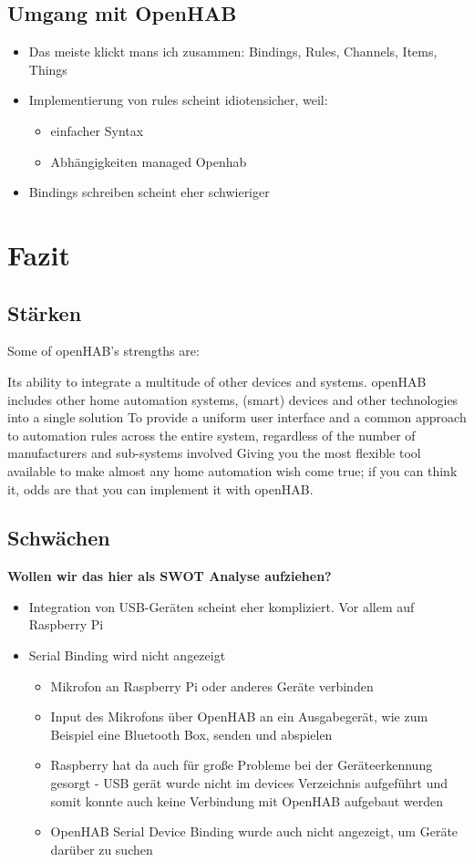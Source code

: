 \subsection{Umgang mit OpenHAB}
\begin{itemize}
	\item Das meiste klickt mans ich zusammen: Bindings, Rules, Channels, Items, Things
	\item Implementierung von rules scheint idiotensicher, weil:
	\begin{itemize}
		\item einfacher Syntax
		\item Abhängigkeiten managed Openhab
	\end{itemize}
	\item Bindings schreiben scheint eher schwieriger
\end{itemize}

\section{Fazit}
\subsection{Stärken}
Some of openHAB's strengths are:

Its ability to integrate a multitude of other devices and systems. openHAB includes other home automation systems, (smart) devices and other technologies into a single solution
To provide a uniform user interface and a common approach to automation rules across the entire system, regardless of the number of manufacturers and sub-systems involved
Giving you the most flexible tool available to make almost any home automation wish come true; if you can think it, odds are that you can implement it with openHAB.
\subsection{Schwächen}
\textbf{Wollen wir das hier als SWOT Analyse aufziehen?}
\begin{itemize}
	\item Integration von USB-Geräten scheint eher kompliziert. Vor allem auf Raspberry Pi
	\item Serial Binding wird nicht angezeigt
	\begin{itemize}
		\item Mikrofon an Raspberry Pi oder anderes Geräte verbinden
		\item Input des Mikrofons über OpenHAB an ein Ausgabegerät, wie zum Beispiel eine Bluetooth Box, senden und abspielen
		\item Raspberry hat da auch für große Probleme bei der Geräteerkennung gesorgt - USB gerät wurde nicht im devices Verzeichnis aufgeführt und somit konnte auch keine Verbindung mit OpenHAB aufgebaut werden
		\item OpenHAB Serial Device Binding wurde auch nicht angezeigt, um Geräte darüber zu suchen
	\end{itemize}
\end{itemize}

